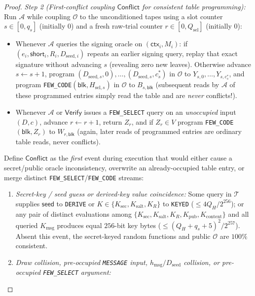 \documentclass[11pt,a4paper]{article}
\theoremstyle{definition}
\theoremstyle{remark}
\begin{document}
\begin{proof}
\emph{Step 2 (First-conflict coupling $\mathsf{Conflict}$ for consistent table programming):}
Run $\mathcal{A}$ while coupling $\mathcal{O}$ to the unconditioned tapes using a slot counter $s \in [0, q_s]$ (initially $0$) and a fresh raw-trial counter $r \in [0, Q_{\mathrm{sel}}]$ (initially $0$):
\begin{itemize}[leftmargin=1.4em,itemsep=1pt]
  \item Whenever $\mathcal{A}$ queries the signing oracle on $(\mathsf{ctx}_i, M_i)$: if $(e_i, \mathsf{short}_i, R_i, D_{\mathrm{seed}, i})$ repeats an earlier signing query, replay that exact signature without advancing $s$ (revealing zero new leaves). Otherwise advance $s \gets s + 1$, program $(D_{\mathrm{seed}, s}, 0), \dots, (D_{\mathrm{seed}, s}, c_s^*)$ in $\mathcal{O}$ to $Y_{s, 0}, \dots, Y_{s, c_s^*}$, and program \texttt{FEW\_CODE}$(\mathsf{blk}, H_{\mathrm{sel}, s})$ in $\mathcal{O}$ to $B_{s, \mathsf{blk}}$ (subsequent reads by $\mathcal{A}$ of these programmed entries simply read the table and are \emph{never} conflicts!).
  \item Whenever $\mathcal{A}$ or $\mathsf{Verify}$ issues a \texttt{FEW\_SELECT} query on an \emph{unoccupied} input $(D, c)$, advance $r \gets r + 1$, return $Z_r$, and if $Z_r \in V$ program \texttt{FEW\_CODE}$(\mathsf{blk}, Z_r)$ to $W_{r, \mathsf{blk}}$ (again, later reads of programmed entries are ordinary table reads, never conflicts).
\end{itemize}
Define $\mathsf{Conflict}$ as the \emph{first} event during execution that would either cause a secret/public oracle inconsistency, overwrite an already-occupied table entry, or merge distinct \texttt{FEW\_SELECT}/\texttt{FEW\_CODE} streams:
\begin{enumerate}[leftmargin=1.4em,itemsep=1pt]
  \item \emph{Secret-key / seed guess or derived-key value coincidence:} Some query in $\mathcal{T}$ supplies $\mathsf{seed}$ to \texttt{DERIVE} or $K \in \{K_{\mathrm{sec}}, K_{\mathrm{salt}}, K_R\}$ to \texttt{KEYED} ($\le 4 Q_H / 2^{256}$); or any pair of distinct evaluations among $\{K_{\mathrm{sec}}, K_{\mathrm{salt}}, K_R, K_{\mathrm{pub}}, K_{\mathrm{content}}\}$ and all queried $K_{\mathrm{msg}}$ produces equal $256$-bit key bytes ($\le (Q_H + q_s + 5)^2 / 2^{257}$). Absent this event, the secret-keyed random functions and public $\mathcal{O}$ are $100\%$ consistent.
  \item \emph{Draw collision, pre-occupied \texttt{MESSAGE} input, $h_{\mathrm{msg}}/D_{\mathrm{seed}}$ collision, or pre-occupied \texttt{FEW\_SELECT} argument:}

\end{enumerate}
\end{proof}
\end{document}
